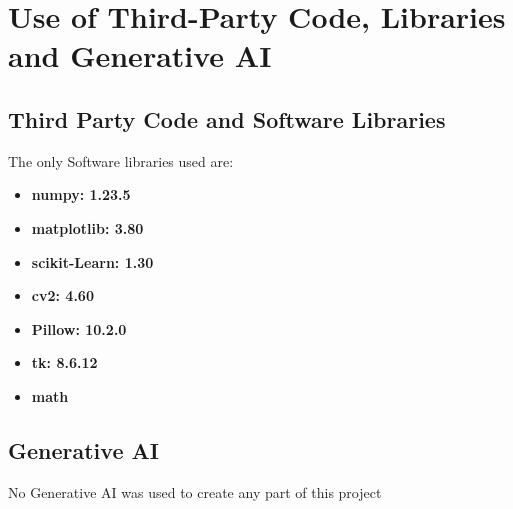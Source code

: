 \chapter{Use of Third-Party Code, Libraries and Generative AI}

\section{Third Party Code and Software Libraries}

The only Software libraries used are:

\begin{itemize}
    \item \textbf{numpy: 1.23.5}
    \item \textbf{matplotlib: 3.80}
    \item \textbf{scikit-Learn: 1.30}
    \item \textbf{cv2: 4.60}
    \item \textbf{Pillow: 10.2.0}
    \item \textbf{tk: 8.6.12}
    \item \textbf{math}
\end{itemize}


\section{Generative AI}

No Generative AI was used to create any part of this project

